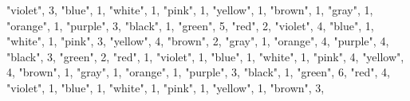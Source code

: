 \documentclass[
]{article}
\newenvironment{Shaded}{\begin{snugshade}}{\end{snugshade}}
\newcommand{\DecValTok}[1]{\textcolor[rgb]{0.00,0.00,0.81}{#1}}
\newcommand{\NormalTok}[1]{#1}
\newcommand{\StringTok}[1]{\textcolor[rgb]{0.31,0.60,0.02}{#1}}
\begin{document}
\begin{Shaded}
\begin{Highlighting}[]
  \StringTok{"violet"}\NormalTok{, }\DecValTok{3}\NormalTok{,}
  \StringTok{"blue"}\NormalTok{, }\DecValTok{1}\NormalTok{,}
  \StringTok{"white"}\NormalTok{, }\DecValTok{1}\NormalTok{,}
  \StringTok{"pink"}\NormalTok{, }\DecValTok{1}\NormalTok{,}
  \StringTok{"yellow"}\NormalTok{, }\DecValTok{1}\NormalTok{,}
  \StringTok{"brown"}\NormalTok{, }\DecValTok{1}\NormalTok{,}
  \StringTok{"gray"}\NormalTok{, }\DecValTok{1}\NormalTok{,}
  \StringTok{"orange"}\NormalTok{, }\DecValTok{1}\NormalTok{,}
  \StringTok{"purple"}\NormalTok{, }\DecValTok{3}\NormalTok{,}
    \StringTok{"black"}\NormalTok{, }\DecValTok{1}\NormalTok{,}
  \StringTok{"green"}\NormalTok{, }\DecValTok{5}\NormalTok{,}
  \StringTok{"red"}\NormalTok{, }\DecValTok{2}\NormalTok{,}
  \StringTok{"violet"}\NormalTok{, }\DecValTok{4}\NormalTok{,}
  \StringTok{"blue"}\NormalTok{, }\DecValTok{1}\NormalTok{,}
  \StringTok{"white"}\NormalTok{, }\DecValTok{1}\NormalTok{,}
  \StringTok{"pink"}\NormalTok{, }\DecValTok{3}\NormalTok{,}
  \StringTok{"yellow"}\NormalTok{, }\DecValTok{4}\NormalTok{,}
  \StringTok{"brown"}\NormalTok{, }\DecValTok{2}\NormalTok{,}
  \StringTok{"gray"}\NormalTok{, }\DecValTok{1}\NormalTok{,}
  \StringTok{"orange"}\NormalTok{, }\DecValTok{4}\NormalTok{,}
  \StringTok{"purple"}\NormalTok{, }\DecValTok{4}\NormalTok{,}
    \StringTok{"black"}\NormalTok{, }\DecValTok{3}\NormalTok{,}
  \StringTok{"green"}\NormalTok{, }\DecValTok{2}\NormalTok{,}
  \StringTok{"red"}\NormalTok{, }\DecValTok{1}\NormalTok{,}
  \StringTok{"violet"}\NormalTok{, }\DecValTok{1}\NormalTok{,}
  \StringTok{"blue"}\NormalTok{, }\DecValTok{1}\NormalTok{,}
  \StringTok{"white"}\NormalTok{, }\DecValTok{1}\NormalTok{,}
  \StringTok{"pink"}\NormalTok{, }\DecValTok{4}\NormalTok{,}
  \StringTok{"yellow"}\NormalTok{, }\DecValTok{4}\NormalTok{,}
  \StringTok{"brown"}\NormalTok{, }\DecValTok{1}\NormalTok{,}
  \StringTok{"gray"}\NormalTok{, }\DecValTok{1}\NormalTok{,}
  \StringTok{"orange"}\NormalTok{, }\DecValTok{1}\NormalTok{,}
  \StringTok{"purple"}\NormalTok{, }\DecValTok{3}\NormalTok{,}
    \StringTok{"black"}\NormalTok{, }\DecValTok{1}\NormalTok{,}
  \StringTok{"green"}\NormalTok{, }\DecValTok{6}\NormalTok{,}
  \StringTok{"red"}\NormalTok{, }\DecValTok{4}\NormalTok{,}
  \StringTok{"violet"}\NormalTok{, }\DecValTok{1}\NormalTok{,}
  \StringTok{"blue"}\NormalTok{, }\DecValTok{1}\NormalTok{,}
  \StringTok{"white"}\NormalTok{, }\DecValTok{1}\NormalTok{,}
  \StringTok{"pink"}\NormalTok{, }\DecValTok{1}\NormalTok{,}
  \StringTok{"yellow"}\NormalTok{, }\DecValTok{1}\NormalTok{,}
  \StringTok{"brown"}\NormalTok{, }\DecValTok{3}\NormalTok{,}

\end{Highlighting}
\end{Shaded}
\end{document}
